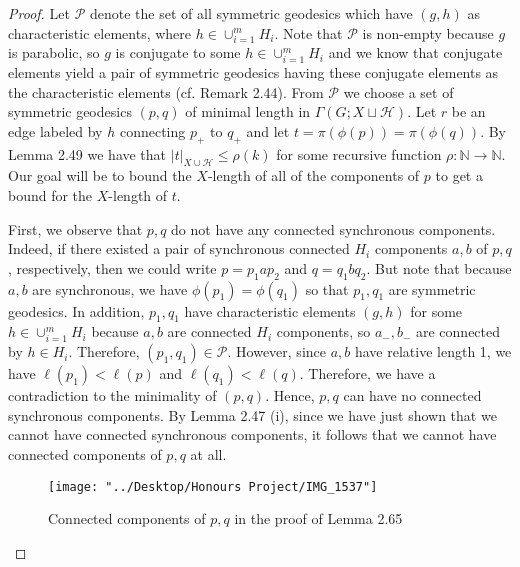 \documentclass[12pt]{article}
\newcommand{\vs}{\vskip10pt}
\begin{document}
	\begin{proof}
		
		Let $\mathcal{P}$ denote the set of all symmetric geodesics which have $(g,h)$ as characteristic elements, where $h \in \cup_{i=1}^m H_i$. Note that $\mathcal{P}$ is non-empty because $g$ is parabolic, so $g$ is conjugate to some $h \in \cup_{i=1}^m H_i$ and we know that conjugate elements yield a pair of symmetric geodesics having these conjugate elements as the characteristic elements (cf. Remark 2.44). From $\mathcal{P}$ we choose a set of symmetric geodesics $(p,q)$ of minimal length in $\Gamma(G; X \sqcup \mathcal{H})$. Let $r$ be an edge labeled by $h$ connecting $p_+$ to $q_+$ and let $t = \pi(\phi(p)) = \pi(\phi(q))$. By Lemma 2.49 we have that $\vert t \vert_{X \cup \mathcal{H}} \leq \rho(k)$ for some recursive function $\rho: \mathbb{N} \rightarrow \mathbb{N}$. Our goal will be to bound the $X$-length of all of the components of $p$ to get a bound for the $X$-length of $t$. 
		
		\vs 
		
		First, we observe that $p,q$ do not have any connected synchronous components. Indeed, if there existed a pair of synchronous connected $H_i$ components $a,b$ of $p,q$, respectively, then we could write $p = p_1 a p_2$ and $q = q_1 b q_2$. But note that because $a,b$ are synchronous, we have $\phi(p_1) = \phi(q_1)$ so that $p_1, q_1$ are symmetric geodesics. In addition, $p_1, q_1$ have characteristic elements $(g,h)$ for some $h \in \cup_{i=1}^m H_i$ because $a,b$ are connected $H_i$ components, so $a_{-}, b_{-}$ are connected by $h \in H_i$. Therefore, $(p_1,q_1) \in \mathcal{P}$. However, since $a,b$ have relative length 1, we have $\ell(p_1) < \ell(p)$ and $\ell(q_1) < \ell(q)$. Therefore, we have a contradiction to the minimality of $(p,q)$. Hence, $p,q$ can have no connected synchronous components. By Lemma 2.47 (i), since we have just shown that we cannot have connected synchronous components, it follows that we cannot have connected components of $p,q$ at all. 
		
\begin{figure} [H]
	\centering
	\texttt{[image: "../Desktop/Honours Project/IMG\_1537"]}
	\caption{Connected components of $p,q$ in the proof of Lemma 2.65}
	\label{fig:img1537}
\end{figure}
		
		\vs 
		

\end{proof}
\end{document}
